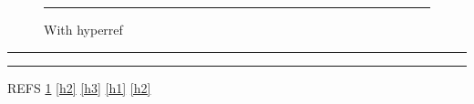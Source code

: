 \documentclass{article}
\begin{document}
\listoffigures
\begin{figure}[h]\centering\rule{2cm}{1cm}\caption{With hyperref}\label{h1}\end{figure}
\begin{table}[h]\caption{Table above}\label{h2}\centering\rule{2cm}{1cm}\end{table}
\noindent\begin{minipage}{\linewidth}\centering\rule{2cm}{1cm}\label{h3}\end{minipage}
REFS \ref{h1} \ref{h2} \ref{h3} \autoref{h1} \autoref{h2}
\end{document}

